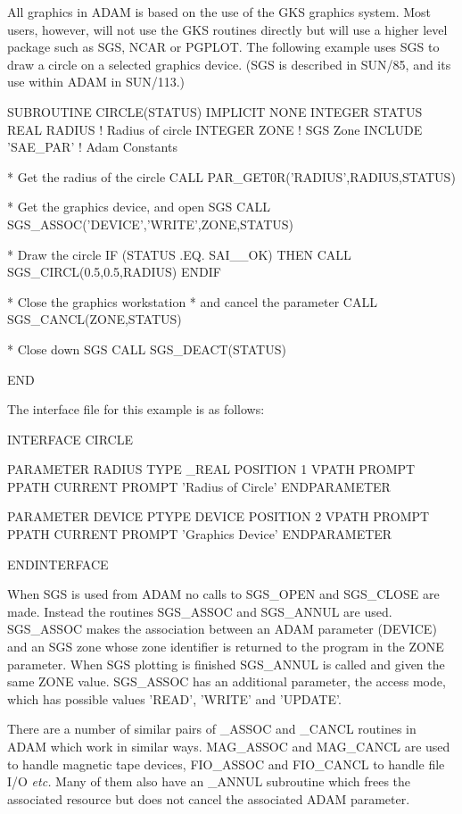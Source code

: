 \documentclass[twoside,11pt,nolof,chapters]{starlink}
\begin{document}
All graphics in ADAM is based on the use of the GKS graphics system. Most
users, however, will not use the GKS routines directly but will use a
higher level package such as SGS, NCAR or PGPLOT. The following example
uses SGS to draw a circle on a selected graphics device.
(SGS is described in SUN/85, and its use within ADAM in SUN/113.)
\begin{terminalv}
      SUBROUTINE CIRCLE(STATUS)
      IMPLICIT NONE
      INTEGER STATUS
      REAL RADIUS          ! Radius of circle
      INTEGER ZONE         ! SGS Zone
      INCLUDE 'SAE_PAR'    ! Adam Constants

*   Get the radius of the circle
      CALL PAR_GET0R('RADIUS',RADIUS,STATUS)

*   Get the graphics device, and open SGS
      CALL SGS_ASSOC('DEVICE','WRITE',ZONE,STATUS)

*   Draw the circle
      IF (STATUS .EQ. SAI__OK) THEN
          CALL SGS_CIRCL(0.5,0.5,RADIUS)
      ENDIF

*   Close the graphics workstation
*   and cancel the parameter
      CALL SGS_CANCL(ZONE,STATUS)

*   Close down SGS
      CALL SGS_DEACT(STATUS)

      END
\end{terminalv}

The interface file for this example is as follows:

\begin{terminalv}
INTERFACE CIRCLE

   PARAMETER RADIUS
      TYPE _REAL
      POSITION 1
      VPATH PROMPT
      PPATH CURRENT
      PROMPT 'Radius of Circle'
   ENDPARAMETER

   PARAMETER DEVICE
      PTYPE DEVICE
      POSITION 2
      VPATH PROMPT
      PPATH CURRENT
      PROMPT 'Graphics Device'
   ENDPARAMETER

ENDINTERFACE
\end{terminalv}

When SGS is used from ADAM no calls to SGS\_OPEN and SGS\_CLOSE are made.
Instead the routines SGS\_ASSOC and SGS\_ANNUL are used. SGS\_ASSOC makes
the association between an ADAM parameter (DEVICE) and an SGS zone whose
zone identifier is returned to the program in the ZONE parameter. When
SGS plotting is finished SGS\_ANNUL is called and given the same ZONE
value. SGS\_ASSOC has an additional parameter, the access mode, which has
possible values 'READ', 'WRITE' and 'UPDATE'.

There are a number of similar pairs of \_ASSOC and \_CANCL routines in ADAM
which work in similar ways. MAG\_ASSOC and MAG\_CANCL are used to handle
magnetic tape devices, FIO\_ASSOC and FIO\_CANCL to handle file I/O \emph{etc.}
Many of them also have an \_ANNUL subroutine which frees the associated
resource but does not cancel the associated ADAM parameter.
\end{document}
